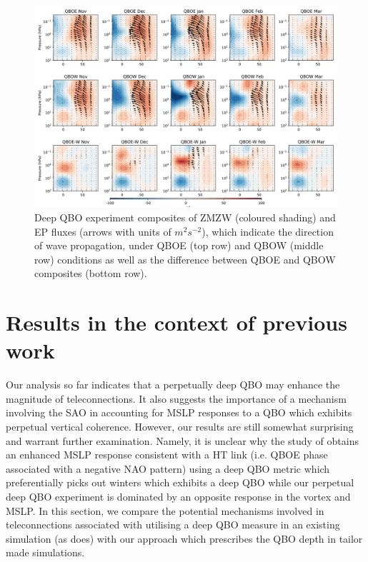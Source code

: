 \begin{figure}[h!]
\begin{center}
\noindent\includegraphics[width = \linewidth]{Figures/Figures-deepQBO/EP_flux_composites_by_month_QBO_phases_d_higher_MarQBO_vs_Mar_30hPa_5thresh.png}
\caption[EP flux composites under different QBO phases in the deep QBO simulation]{Deep QBO experiment composites of ZMZW (coloured shading) and EP fluxes (arrows with units of $m^2s^{-2}$), which indicate the direction of wave propagation, under QBOE (top row) and QBOW (middle row) conditions as well as the difference between QBOE and QBOW composites (bottom row).}
\label{fig:EP_deep}
\end{center}
\end{figure}
\newpage

\section{Results in the context of previous work}
Our analysis so far indicates that a perpetually deep QBO may enhance the magnitude of teleconnections. It also suggests the importance of a mechanism involving the SAO in accounting for MSLP responses to a QBO which exhibits perpetual vertical coherence. However, our results are still somewhat surprising and warrant further examination. Namely, it is unclear why the study of \cite{andrewsObserved2019d} obtains an enhanced MSLP response consistent with a HT link (i.e. QBOE phase associated with a negative NAO pattern) using a deep QBO metric which preferentially picks out winters which exhibits a deep QBO while our perpetual deep QBO experiment is dominated by an opposite response in the vortex and MSLP. In this section, we compare the potential mechanisms involved in teleconnections associated with utilising a deep QBO measure in an existing simulation (as \cite{andrewsObserved2019d} does) with our approach which prescribes the QBO depth in tailor made simulations. 

